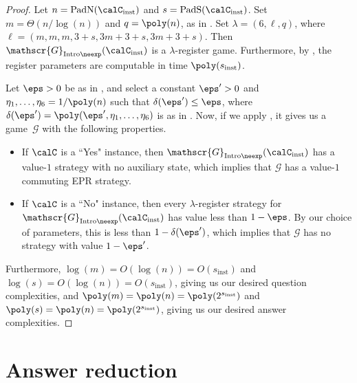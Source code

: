 \documentclass[11pt]{article}
\newcommand{\game}{\mathscr{G}}
\begin{document}
\begin{proof}
Let $n = \mathrm{PadN}(\calC_{\mathrm{inst}})$ and $s = \mathrm{PadS}(\calC_{\mathrm{inst}})$.
Set $m = \Theta(n/\log(n))$ and $q = \poly(n)$,
as in .
Set $\lambda = (6, \ell, q)$,
where $\ell = (m, m, m, 3+s, 3m + 3 + s, 3m + 3 + s)$.
Then $\game_{\mathrm{Intro}\neexp}(\calC_{\mathrm{inst}})$
is a $\lambda$-register game.
Furthermore, by ,
the register parameters are computable in time $\poly(s_{\mathrm{inst}})$.

Let $\eps >0$ be as in , and select a constant $\eps' > 0$ and $\eta_1, \ldots, \eta_{6} = 1/\poly(n)$
such that $\delta(\eps') \leq \eps$, where $\delta(\eps') = \poly(\eps', \eta_1, \ldots, \eta_{6})$ is as in .
Now, if we apply , it gives us a game~$\game$ with the following properties.
\begin{itemize}
\item[$\circ$] If $\calC$ is a ``Yes" instance, then $\game_{\mathrm{Intro}\neexp}(\calC_{\mathrm{inst}})$ has a value-$1$ strategy with no auxiliary state, which implies that $\game$ has a value-$1$ commuting EPR strategy.
\item[$\circ$] If $\calC$ is a ``No" instance, then every $\lambda$-register strategy for
		$\game_{\mathrm{Intro}\neexp}(\calC_{\mathrm{inst}})$ has value less than $1-\eps$.
		By our choice of parameters, this is less than $1-\delta(\eps')$, which implies that $\game$ has no strategy with value $1-\eps'$.
\end{itemize}
Furthermore, $\log(m) = O(\log(n)) = O(s_{\mathrm{inst}})$ and $\log(s) = O(\log(n)) = O(s_{\mathrm{inst}})$, giving us our desired question complexities,
and $\poly(m) = \poly(n) = \poly(2^{s_{\mathrm{inst}}})$ and $\poly(s) = \poly(n) = \poly(2^{s_\mathrm{inst}})$, giving us our desired answer complexities.
\end{proof}


\part{Answer reduction}

\label{part:answer}

\end{document}
